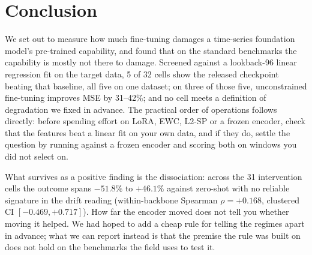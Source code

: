 \section{Conclusion}
\label{sec:conclusion}

We set out to measure how much fine-tuning damages a time-series foundation
model's pre-trained capability, and found that on the standard benchmarks the
capability is mostly not there to damage.  Screened against a lookback-96
linear regression fit on the target data, 5 of 32 cells show the released
checkpoint beating that baseline, all five on one dataset; on three of those
five, unconstrained fine-tuning improves MSE by 31--42\%; and no cell
meets a definition of degradation we fixed in advance.  The practical order of
operations follows directly: before spending effort on LoRA, EWC, L2-SP or a
frozen encoder, check that the features beat a linear fit on your own data, and
if they do, settle the question by running against a frozen encoder and scoring
both on windows you did not select on.

What survives as a positive finding is the dissociation: across the 31
intervention cells the outcome spans $-51.8\%$ to $+46.1\%$ against zero-shot
with no reliable signature in the drift reading (within-backbone Spearman
$\rho{=}{+}0.168$, clustered CI $[-0.469,{+}0.717]$).  How far the encoder moved
does not tell you whether moving it helped.  We had hoped to add a cheap rule
for telling the regimes apart in advance; what we can report instead is that
the premise the rule was built on does not hold on the benchmarks the field
uses to test it.
